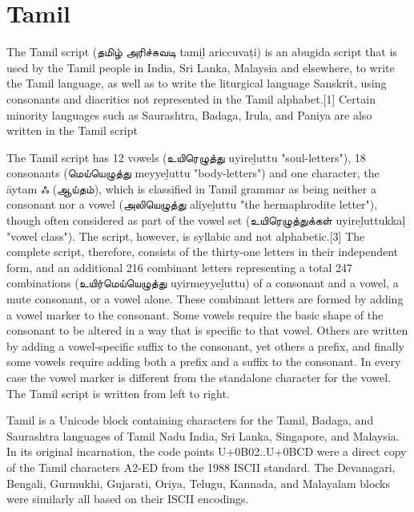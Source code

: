 \section{Tamil}
\label{s:tamil}
\newfontfamily{}

\def\tamiltext#1{{\tamil#1}}

The Tamil script (\tamiltext{தமிழ் அரிச்சுவடி} tamiḻ ariccuvaṭi) is an abugida script that is used by the Tamil people in India, Sri Lanka, Malaysia and elsewhere, to write the Tamil language, as well as to write the liturgical language Sanskrit, using consonants and diacritics not represented in the Tamil alphabet.[1] Certain minority languages such as Saurashtra, Badaga, Irula, and Paniya are also written in the Tamil script

The Tamil script has 12 vowels (\tamiltext{உயிரெழுத்து} uyireḻuttu "soul-letters"), 18 consonants (\tamiltext{மெய்யெழுத்து} meyyeḻuttu "body-letters") and one character, the āytam \tamiltext{ஃ (ஆய்தம்)}, which is classified in Tamil grammar as being neither a consonant nor a vowel (\tamiltext{அலியெழுத்து} aliyeḻuttu "the hermaphrodite letter"), though often considered as part of the vowel set (\tamiltext{உயிரெழுத்துக்கள்} uyireḻuttukkaḷ "vowel class"). The script, however, is syllabic and not alphabetic.[3] The complete script, therefore, consists of the thirty-one letters in their independent form, and an additional 216 combinant letters representing a total 247 combinations (\tamiltext{உயிர்மெய்யெழுத்து} uyirmeyyeḻuttu) of a consonant and a vowel, a mute consonant, or a vowel alone. These combinant letters are formed by adding a vowel marker to the consonant. Some vowels require the basic shape of the consonant to be altered in a way that is specific to that vowel. Others are written by adding a vowel-specific suffix to the consonant, yet others a prefix, and finally some vowels require adding both a prefix and a suffix to the consonant. In every case the vowel marker is different from the standalone character for the vowel.
The Tamil script is written from left to right.

Tamil is a Unicode block containing characters for the Tamil, Badaga, and Saurashtra languages of Tamil Nadu India, Sri Lanka, Singapore, and Malaysia. In its original incarnation, the code points U+0B02..U+0BCD were a direct copy of the Tamil characters A2-ED from the 1988 ISCII standard. The Devanagari, Bengali, Gurmukhi, Gujarati, Oriya, Telugu, Kannada, and Malayalam blocks were similarly all based on their ISCII encodings.

